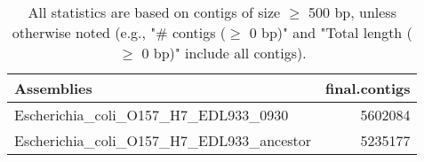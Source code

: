 \documentclass[12pt,a4paper]{article}
\begin{document}
\begin{table}[ht]
\begin{center}
\caption{All statistics are based on contigs of size $\geq$ 500 bp, unless otherwise noted (e.g., "\# contigs ($\geq$ 0 bp)" and "Total length ($\geq$ 0 bp)" include all contigs).}
\begin{tabular}{|l*{1}{|r}|}
\hline
Assemblies & final.contigs \\ \hline
Escherichia\_coli\_O157\_H7\_EDL933\_0930 & 5602084 \\ \hline
Escherichia\_coli\_O157\_H7\_EDL933\_ancestor & 5235177 \\ \hline
\end{tabular}
\end{center}
\end{table}
\end{document}

